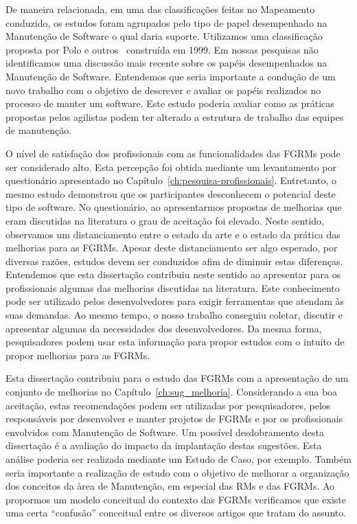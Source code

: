 De maneira relacionada, em uma das classificações feitas no Mapeamento
conduzido, os estudos foram agrupados pelo tipo de papel desempenhado na
Manutenção de Software o qual daria suporte. Utilizamos uma classificação
proposta por Polo e outros~\cite{Polo1999} construída em 1999. Em nossas
pesquisas não identificamos uma discussão mais recente sobre os papéis
desempenhados na Manutenção de Software. Entendemos que seria importante a
condução de um novo trabalho com o objetivo de descrever e avaliar os papéis
realizados no processo de manter um software. Este estudo poderia avaliar como
as práticas propostas pelos agilistas podem ter alterado a estrutura de trabalho
das equipes de manutenção.

O nível de satisfação dos profissionais com as funcionalidades das FGRMs pode
ser considerado alto. Esta percepção foi obtida mediante um levantamento por
questionário apresentado no Capítulo~\ref{ch:pesquisa-profissionais}.
Entretanto, o mesmo estudo demonstrou que os participantes desconhecem o
potencial deste tipo de software. No questionário, ao apresentarmos propostas de
melhorias que eram discutidas na literatura o grau de aceitação foi elevado.
Neste sentido, observamos um distanciamento entre o estado da arte e o estado da
prática das melhorias para as FGRMs. Apesar deste distanciamento ser algo
esperado, por diversas razões, estudos devem ser conduzidos afim de diminuir
estas diferenças. Entendemos que esta dissertação contribuiu neste sentido ao
apresentar para os profissionais algumas das melhorias discutidas na literatura.
Este conhecimento pode ser utilizado pelos desenvolvedores para exigir
ferramentas que atendam às suas demandas. Ao mesmo tempo, o nosso trabalho
conseguiu coletar, discutir e apresentar algumas da necessidades dos
desenvolvedores. Da mesma forma, pesquisadores podem usar esta informação para
propor estudos com o intuito de propor melhorias para as FGRMs.

Esta dissertação contribuiu para o estudo das FGRMs com a apresentação de um
conjunto de melhorias no Capítulo~\ref{ch:sug_melhoria}. Considerando a sua boa
aceitação, estas recomendações podem ser utilizadas por pesquisadores, pelos
responsáveis por desenvolver e manter projetos de FGRMs e por os profissionais
envolvidos com Manutenção de Software. Um possível desdobramento desta
dissertação é a avaliação do impacto da implantação destas sugestões. Esta
análise poderia ser realizada mediante um Estudo de Caso, por exemplo. Também
seria importante a realização de estudo com o objetivo de melhorar a organização
dos conceitos da àrea de Manutenção, em especial das RMs e das FGRMs. Ao
propormos um modelo conceitual do contexto das FGRMs verificamos que existe uma
certa ``confusão'' conceitual entre os diversos artigos que tratam do assunto.

